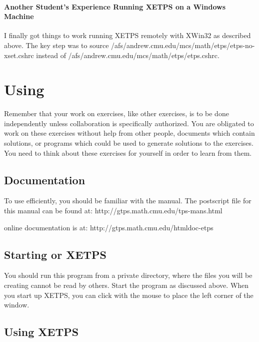 \documentclass{article}
\begin{document}
\paragraph{Another Student's Experience Running XETPS on a Windows Machine}

I finally got things to work running XETPS remotely with XWin32
as described above. The key step was to
source /afs/andrew.cmu.edu/mcs/math/etps/etps-no-xset.cshrc\newline{}
instead of /afs/andrew.cmu.edu/mcs/math/etps/etps.cshrc.


\section{Using {\ETPS}}

Remember that your work on {\ETPS} exercises, like other exercises,
is to be done independently unless collaboration is specifically
authorized. You are obligated to work on these exercises
without help from other people, documents which contain
solutions, or programs which could be used to generate
solutions to the exercises. You need to think about these exercises
for yourself in order to learn from them.

\subsection{Documentation}

To use {\ETPS} efficiently, you should be familiar with the
{\ETPS} manual. The postscript file for this manual can be found at:\newline{}
http://gtps.math.cmu.edu/tps-mans.html

{\ETPS} online documentation is at:\newline{}
http://gtps.math.cmu.edu/htmldoc-etps

\subsection{Starting {\ETPS} or XETPS}

You should run this program from a private directory, where the files
you will be creating cannot be read by others. Start the program as
discussed above. When you start up XETPS, you can click with the mouse
to place the left corner of the window.

\subsection{Using XETPS}
\end{document}
